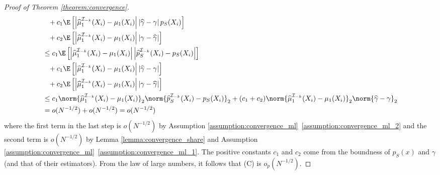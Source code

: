 \begin{appendix}
\begin{proof}[Proof of Theorem \ref{theorem:convergence}]
\begin{align}
\begin{split}
            &\phantom{=} + c_1 \E\left[\left\vert \widehat\mu^{\mathcal{I}_{-k}}_1(X_i)  - \mu_1(X_i)\right\vert \left\vert \widehat{\gamma} - \gamma \right\vert p_S(X_i) \right]\\
            &\phantom{=} + c_2 \E\left[\left\vert \widehat\mu^{\mathcal{I}_{-k}}_1(X_i)  - \mu_1(X_i)\right\vert \left\vert \gamma-\widehat{\gamma}\right\vert\right]\\
            &\leq c_1 \E\left[\left\vert \widehat\mu^{\mathcal{I}_{-k}}_1(X_i)  - \mu_1(X_i)\right\vert \left\vert \widehat{p}_S^{\mathcal{I}_{-k}}(X_i)- p_S(X_i)\right\vert \right] \\
            &\phantom{=} + c_1 \E\left[\left\vert \widehat\mu^{\mathcal{I}_{-k}}_1(X_i)  - \mu_1(X_i)\right\vert \left\vert \widehat{\gamma} - \gamma \right\vert \right]\\
            &\phantom{=} + c_2 \E\left[\left\vert \widehat\mu^{\mathcal{I}_{-k}}_1(X_i)  - \mu_1(X_i)\right\vert \left\vert \gamma-\widehat{\gamma}\right\vert\right]\\
            &\leq c_1 \norm{\widehat\mu^{\mathcal{I}_{-k}}_1(X_i)  - \mu_1(X_i)}_2 \norm{\widehat{p}_S^{\mathcal{I}_{-k}}(X_i)- p_S(X_i)}_2 + (c_1 + c_2) \norm{\widehat\mu^{\mathcal{I}_{-k}}_1(X_i)  - \mu_1(X_i)}_2 \norm{\widehat{\gamma} - \gamma}_2\\
            &= o(N^{-1/2}) + o(N^{-1/2}) = o(N^{-1/2})  
        \end{split}
    \end{align}
    where the first term in the last step is $o(N^{-1/2})$ by Assumption \ref{assumption:convergence_ml}~\ref{assumption:convergence_ml_2} and the second term is $o(N^{-1/2})$ by Lemma \ref{lemma:convergence_share} and Assumption \ref{assumption:convergence_ml}~\ref{assumption:convergence_ml_1}. The positive constants $c_1$ and $c_2$ come from the boundness of $p_S(x)$ and $\gamma$ (and that of their estimators). From the law of large numbers, it follows that (C) is $o_p(N^{-1/2})$. 
\end{proof}


\end{appendix}

